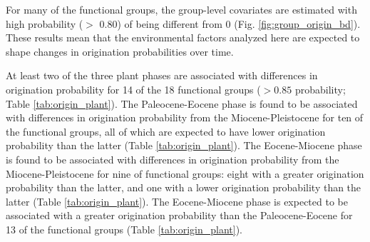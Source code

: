 \documentclass[12pt,letterpaper]{article}
\begin{document}
For many of the functional groups, the group-level covariates are estimated with high probability (\(>\) 0.80) of being different from 0 (Fig. \ref{fig:group_origin_bd}). These results mean that the environmental factors analyzed here are expected to shape changes in origination probabilities over time. 

At least two of the three plant phases are associated with differences in origination probability for 14 of the 18 functional groups (\(> 0.85\) probability; Table \ref{tab:origin_plant}). The Paleocene-Eocene phase is found to be associated with differences in origination probability from the Miocene-Pleistocene for ten of the functional groups, all of which are expected to have lower origination probability than the latter (Table \ref{tab:origin_plant}). The Eocene-Miocene phase is found to be associated with differences in origination probability from the Miocene-Pleistocene for nine of functional groups: eight with a greater origination probability than the latter, and one with a lower origination probability than the latter (Table \ref{tab:origin_plant}). The Eocene-Miocene phase is expected to be associated with a greater origination probability than the Paleocene-Eocene for 13 of the functional groups (Table \ref{tab:origin_plant}). 
\end{document}
